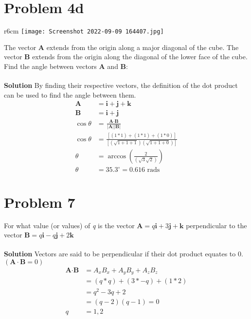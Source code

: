 \documentclass[]{article}
\newcommand{\bd}{\textbf}
\newcommand{\ih}{\bd{i}}
\newcommand{\jh}{\bd{j}}
\newcommand{\kh}{\bd{k}}
\begin{document}
\section{Problem 4d}
\begin{wrapfigure}[10]{r}{6cm}
\texttt{[image: Screenshot 2022-09-09 164407.jpg]}
\end{wrapfigure}
The vector \bd{A} extends from the origin along a major diagonal of the cube. The vector \bd{B} extends from the origin along the diagonal of the lower face of the cube. Find the angle between vectors \bd{A} and \bd{B}:
\\\\
\bd{Solution} By finding their respective vectors, the definition of the dot product can be used to find the angle between them.
\begin{equation}
\begin{split}
\bd{A} &= \ih + \jh + \kh \\
\bd{B} &= \ih + \jh \\
\cos \theta &= \frac{\bd{A} \cdot \bd{B}}{\left\lvert \bd{A} \right\rvert \left\lvert \bd{B} \right\rvert} \\
\cos \theta &= \frac{[(1 * 1) + (1 * 1) + (1 * 0)]}{[(\sqrt{1 + 1 + 1})(\sqrt{1 + 1 + 0})]} \\
\theta &= \arccos \left( \frac{2}{(\sqrt{3} \sqrt{2})} \right) \\
\theta &= 35.3^\circ = 0.616 \text{ rads}
\end{split}
\end{equation}

\section{Problem 7}
For what value (or values) of \textit{q} is the vector $ \bd{A} = q\ih + 3\jh + \kh $ perpendicular to the vector $ \bd{B} = q\ih - q\jh + 2\kh $ 
\\\\
\bd{Solution} Vectors are said to be perpendicular if their dot product equates to 0. $ (\bd{A} \cdot \bd{B} = 0) $
\begin{equation}
\begin{split}
\bd{A} \cdot \bd{B} &= A_xB_x + A_yB_y + A_zB_z \\
&=(q * q) + (3 * -q) + (1 * 2) \\
&=q^2 - 3q + 2 \\
&=(q - 2)(q - 1) = 0 \\
q &= 1, 2 \\
\end{split}
\end{equation}
\end{document}
